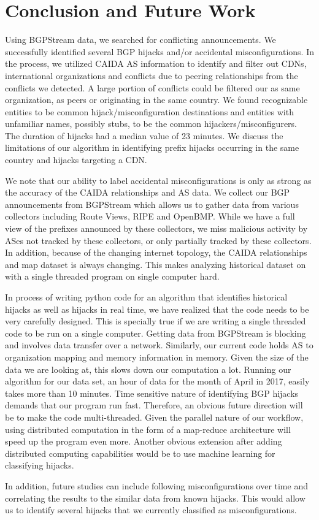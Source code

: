 \section{Conclusion and Future Work}
Using BGPStream data, we searched for conflicting announcements. We successfully identified several BGP hijacks and/or accidental misconfigurations. In the process, we utilized CAIDA AS information to identify and filter out CDNs, international organizations and conflicts due to peering relationships from the conflicts we detected. A large portion of conflicts could be filtered our as same organization, as peers or originating in the same country. We found recognizable entities to be common hijack/misconfiguration destinations and entities with unfamiliar names, possibly stubs, to be the common hijackers/misconfigurers. The duration of hijacks had a median value of 23 minutes. We discuss the limitations of our algorithm in identifying prefix hijacks occurring in the same country and hijacks targeting a CDN. 

We note that our ability to label accidental misconfigurations is only as strong as the accuracy of the CAIDA relationships and AS data. We collect  our BGP announcements from BGPStream which allows us to gather data from various collectors including Route Views, RIPE and OpenBMP. While we have a full view of the prefixes announced by these collectors, we miss malicious activity by ASes not tracked by these collectors, or only partially tracked by these collectors. In addition, because of the changing internet topology, the CAIDA relationships and map dataset is always changing. This makes analyzing historical dataset on with a single threaded program on single computer hard. 

In process of writing python code for an algorithm that identifies historical hijacks as well as hijacks in real time, we have realized that the code needs to be very carefully designed. This is specially true if we are writing a single threaded code to be run on a single computer. Getting data from BGPStream is blocking and involves data transfer over a network. Similarly, our current code holds AS to organization mapping and memory information in memory. Given the size of the data we are looking at, this slows down our computation a lot. Running our algorithm for our data set, an hour of data for the month of April in 2017, easily takes more than 10 minutes. Time sensitive nature of identifying BGP hijacks demands that our program run fast. Therefore, an obvious future direction will be to make the code multi-threaded. Given the parallel nature of our workflow, using distributed computation in the form of a map-reduce architecture will speed up the program even more. Another obvious extension after adding distributed computing capabilities would be to use machine learning for classifying hijacks.

In addition, future studies can include following misconfigurations over time and correlating the results to the similar data from known hijacks. This would allow us to identify several hijacks that we currently classified as misconfigurations. 
